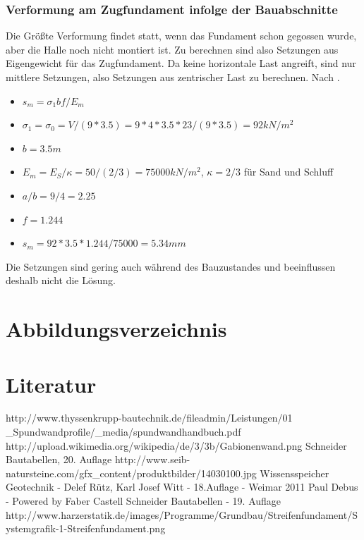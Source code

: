 \documentclass[11pt,fleqn,a4paper,halfparskip]{article}
\begin{document}
\subsubsection{Verformung am Zugfundament infolge der Bauabschnitte}
Die Größte Verformung findet statt, wenn das Fundament schon gegossen wurde, aber die Halle noch nicht montiert ist. Zu berechnen sind also Setzungen aus Eigengewicht für das Zugfundament. Da keine horizontale Last angreift, sind nur mittlere Setzungen, also Setzungen aus zentrischer Last zu berechnen. Nach \cite[S.68]{wsp}.
\begin{itemize}
\item[] $s_m = \sigma_1bf/E_m$
\item[] $\sigma_1 = \sigma_0 = V/(9*3.5) = 9*4*3.5*23/(9*3.5) = 92kN/m^2$
\item[] $b = 3.5m$
\item[] $E_m = E_S/\kappa = 50/(2/3) = 75000kN/m^2$, $\kappa = 2/3$ für Sand und Schluff
\item[] $a/b = 9/4 = 2.25$
\item[] $f = 1.244$
\item[] $s_m = 92*3.5*1.244/75000 = 5.34mm$
\end{itemize}
Die Setzungen sind gering auch während des Bauzustandes \cite[S.37]{wsp} und beeinflussen deshalb nicht die Lösung.

\newpage
\pagestyle{empty}




\pagestyle{plain}
\newpage
\section{Abbildungsverzeichnis}
\listoffigures
\newpage
\section{Literatur}
\begin{thebibliography}{9}
http://www.thyssenkrupp-bautechnik.de/fileadmin/Leistungen/01 \_Spundwandprofile/\_media/spundwandhandbuch.pdf
 http://upload.wikimedia.org/wikipedia/de/3/3b/Gabionenwand.png
 Schneider Bautabellen, 20. Auflage
 http://www.seib-natursteine.com/gfx\_content/produktbilder/14030100.jpg
 Wissensspeicher Geotechnik - Delef Rütz, Karl Josef Witt - 18.Auflage - Weimar 2011
 Paul Debus - Powered by Faber Castell
 Schneider Bautabellen - 19. Auflage
 http://www.harzerstatik.de/images/Programme/Grundbau/Streifenfundament/Systemgrafik-1-Streifenfundament.png
\end{thebibliography}
\end{document}
